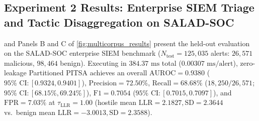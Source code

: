 \documentclass[11pt,a4paper]{article}
\begin{document}
\subsection{Experiment 2 Results: Enterprise SIEM Triage and Tactic Disaggregation on SALAD-SOC}
\label{subsec:res_exp2}

 and Panels B and C of \cref{fig:multicorpus_results} present the held-out evaluation on the SALAD-SOC enterprise SIEM benchmark ($N_{\text{test}} = 125,035$ alerts: $26,571$ malicious, $98,464$ benign). Executing in $384.37\text{ ms}$ total ($0.00307\text{ ms/alert}$), zero-leakage Partitioned PITSA achieves an overall $\text{AUROC} = 0.9380$ ($95\%\text{ CI}: [0.9324, 0.9401]$), $\text{Precision} = 72.50\%$, $\text{Recall} = 68.68\%$ ($18,250 / 26,571$; $95\%\text{ CI}: [68.15\%, 69.24\%]$), $\text{F1} = 0.7054$ ($95\%\text{ CI}: [0.7015, 0.7097]$), and $\text{FPR} = 7.03\%$ at $\tau_{\text{LLR}} = 1.00$ (hostile mean $\text{LLR} = 2.1827, \text{SD} = 2.3644$ vs.\ benign mean $\text{LLR} = -3.0013, \text{SD} = 2.3588$).
\end{document}
